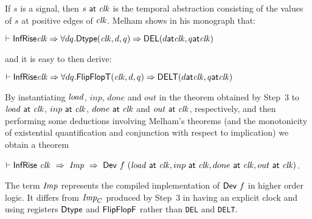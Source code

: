 \documentclass{llncs}
\begin{document}
\vspace*{1mm}

If $s$ is a signal, then $s~\mathsf{at}~\mathit{clk}$ is the temporal
abstraction consisting of the values of $s$ at positive edges of
$\mathit{clk}$. 
Melham shows in his monograph that:

\vspace*{-1mm}


{\baselineskip14pt\begin{alltt}
\( \vdash \DEF{InfRise} \VAR{clk} \Rightarrow {\forall}d q. \DEF{Dtype}(\VAR{clk},d,q) \Rightarrow \DEF{DEL}(d \DEF{at} \VAR{clk}, q \DEF{at} \VAR{clk}) \)
\end{alltt}}

\vspace*{-1mm}

\noindent and it is easy to then derive:

\vspace*{-1mm}

{\baselineskip14pt\begin{alltt}
\( \vdash \DEF{InfRise} \VAR{clk} \Rightarrow {\forall}d q. \DEF{FlipFlopT}(\VAR{clk},d,q) \Rightarrow \DEF{DELT}(d \DEF{at} \VAR{clk}, q \DEF{at} \VAR{clk})  \)
\end{alltt}}

\vspace*{-1mm}

By instantiating $\mathit{load}$, $inp$, $done$ and $out$ in the theorem
obtained by Step~3 to $\mathit{load}~\mathsf{at}~\mathit{clk}$, $inp~\mathsf{at}~\mathit{clk}$,
$done~\mathsf{at}~\mathit{clk}$ and $out~\mathsf{at}~\mathit{clk}$, respectively, and then
performing some deductions involving Melham's theorems (and the
monotonicity of existential quantification and conjunction with
respect to implication) we obtain a theorem

\vspace*{1mm}

$\vdash \mathsf{InfRise}~\mathit{clk}~\Rightarrow~{\it{Imp}}~\Rightarrow~\mathsf{Dev}~f~(\mathit{load}~\mathsf{at}~\mathit{clk},inp~\mathsf{at}~\mathit{clk},done~\mathsf{at}~\mathit{clk},out~\mathsf{at}~\mathit{clk})$.

\vspace*{1mm}

The term ${\it{Imp}}$ represents the compiled implementation of $\mathsf{Dev}~f$ in higher order logic.
It differs from ${\it{Imp}}_C$ produced by Step~3 in having an explicit clock and using
registers $\mathsf{Dtype}$ and $\mathsf{FlipFlopF}$ rather than \texttt{DEL} and \texttt{DELT}.

\vspace*{-3mm}
\end{document}
